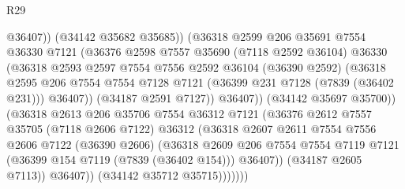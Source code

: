 \begin{lexlean}{R29}
\begin{coremodule}
                                @36407))
                            (@34142 @35682 @35685))
                          (@36318
                            @2599
                            @206
                            @35691
                            @7554
                            @36330
                            @7121
                            (@36376
                              @2598
                              @7557
                              @35690
                              (@7118 @2592 @36104)
                              @36330
                              (@36318
                                @2593
                                @2597
                                @7554
                                @7556
                                @2592
                                @36104
                                (@36390 @2592)
                                (@36318
                                  @2595
                                  @206
                                  @7554
                                  @7554
                                  @7128
                                  @7121
                                  (@36399 @231 @7128 (@7839 (@36402 @231)))
                                  @36407))
                              (@34187 @2591 @7127))
                            @36407))
                        (@34142 @35697 @35700))
                      (@36318
                        @2613
                        @206
                        @35706
                        @7554
                        @36312
                        @7121
                        (@36376
                          @2612
                          @7557
                          @35705
                          (@7118 @2606 @7122)
                          @36312
                          (@36318
                            @2607
                            @2611
                            @7554
                            @7556
                            @2606
                            @7122
                            (@36390 @2606)
                            (@36318
                              @2609
                              @206
                              @7554
                              @7554
                              @7119
                              @7121
                              (@36399 @154 @7119 (@7839 (@36402 @154)))
                              @36407))
                          (@34187 @2605 @7113))
                        @36407))
                    (@34142 @35712 @35715)))))))

\end{coremodule}
\end{lexlean}

